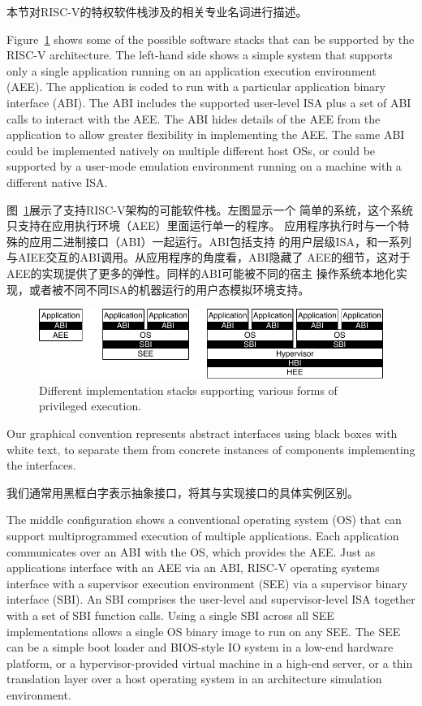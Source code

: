 本节对RISC-V的特权软件栈涉及的相关专业名词进行描述。

Figure~\ref{fig:privimps} shows some of the possible software stacks
that can be supported by the RISC-V architecture.  The left-hand side
shows a simple system that supports only a single application running
on an application execution environment (AEE).  The application is
coded to run with a particular application binary interface (ABI).
The ABI includes the supported user-level ISA plus a set of ABI calls to
interact with the AEE.  The ABI hides details of the AEE from the
application to allow greater flexibility in implementing the AEE.  The
same ABI could be implemented natively on multiple different host OSs,
or could be supported by a user-mode emulation environment running on
a machine with a different native ISA.

图~\ref{fig:privimps}展示了支持RISC-V架构的可能软件栈。左图显示一个
简单的系统，这个系统只支持在应用执行环境（AEE）里面运行单一的程序。
应用程序执行时与一个特殊的应用二进制接口（ABI）一起运行。ABI包括支持
的用户层级ISA，和一系列与AIEE交互的ABI调用。从应用程序的角度看，ABI隐藏了
AEE的细节，这对于AEE的实现提供了更多的弹性。同样的ABI可能被不同的宿主
操作系统本地化实现，或者被不同不同ISA的机器运行的用户态模拟环境支持。

\begin{figure}[th]
\centering
\includegraphics[width=\textwidth]{figs/privimps.pdf}
\caption{Different implementation stacks supporting various forms of
  privileged execution.}
\label{fig:privimps}
\end{figure}

\begin{commentary}
Our graphical convention represents abstract interfaces using black
boxes with white text, to separate them from concrete instances of
components implementing the interfaces.

我们通常用黑框白字表示抽象接口，将其与实现接口的具体实例区别。
\end{commentary}

The middle configuration shows a conventional operating system (OS)
that can support multiprogrammed execution of multiple
applications. Each application communicates over an ABI with the OS,
which provides the AEE.  Just as applications interface with an AEE
via an ABI, RISC-V operating systems interface with a supervisor
execution environment (SEE) via a supervisor binary interface (SBI).
An SBI comprises the user-level and supervisor-level ISA together with
a set of SBI function calls.  Using a single SBI across all SEE
implementations allows a single OS binary image to run on any SEE.
The SEE can be a simple boot loader and BIOS-style IO system in a
low-end hardware platform, or a hypervisor-provided virtual machine in
a high-end server, or a thin translation layer over a host operating
system in an architecture simulation environment.

